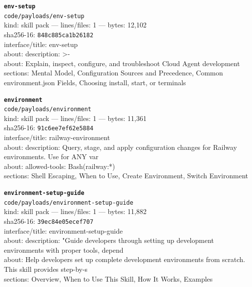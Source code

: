 \noindent\textbf{\texttt{env-setup}}\\
\texttt{code/payloads/env-setup}\\
kind: skill pack --- lines/files: 1 --- bytes: 12,102\\
sha256-16: \texttt{848c885ca1b26182}\\
interface/title: env-setup\\
about: description: >-\\
about: Explain, inspect, configure, and troubleshoot Cloud Agent development\\
sections: Mental Model, Configuration Sources and Precedence, Common environment.json Fields, Choosing install, start, or terminals\\
\vspace*{6.0pt}
\newpage

\noindent\textbf{\texttt{environment}}\\
\texttt{code/payloads/environment}\\
kind: skill pack --- lines/files: 1 --- bytes: 11,361\\
sha256-16: \texttt{91c6ee7ef62e5884}\\
interface/title: railway-environment\\
about: description: Query, stage, and apply configuration changes for Railway environments. Use for ANY var\\
about: allowed-tools: Bash(railway:*)\\
sections: Shell Escaping, When to Use, Create Environment, Switch Environment\\
\vspace*{6.0pt}

\noindent\textbf{\texttt{environment-setup-guide}}\\
\texttt{code/payloads/environment-setup-guide}\\
kind: skill pack --- lines/files: 1 --- bytes: 11,882\\
sha256-16: \texttt{39ec84e05ecef707}\\
interface/title: environment-setup-guide\\
about: description: "Guide developers through setting up development environments with proper tools, depend\\
about: Help developers set up complete development environments from scratch. This skill provides step-by-s\\
sections: Overview, When to Use This Skill, How It Works, Examples\\
\vspace*{6.0pt}

